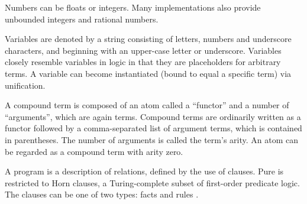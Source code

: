 \documentclass[thesis-solanki.tex]{subfiles}
\begin{document}
Numbers can be floats or integers.
Many  implementations also provide unbounded integers and rational numbers.

Variables are denoted by a string consisting of letters, numbers and underscore characters, and beginning with an
upper-case letter or underscore.
Variables closely resemble variables in logic in that they are placeholders for arbitrary terms.
A variable can become instantiated (bound to equal a specific term) via unification.

A compound term is composed of an atom called a ``functor'' and a number of ``arguments'', which are again terms.
Compound terms are ordinarily written as a functor followed by a comma-separated list of argument terms, which is
contained in parentheses.
The number of arguments is called the term's arity.
An atom can be regarded as a compound term with arity zero.

A  program is a description of relations, defined by the use of clauses.
Pure  is restricted to Horn clauses, a Turing-complete subset of first-order predicate logic.
The clauses can be one of two types: facts and rules \cite{website:prologintroumiami}.

\end{document}
